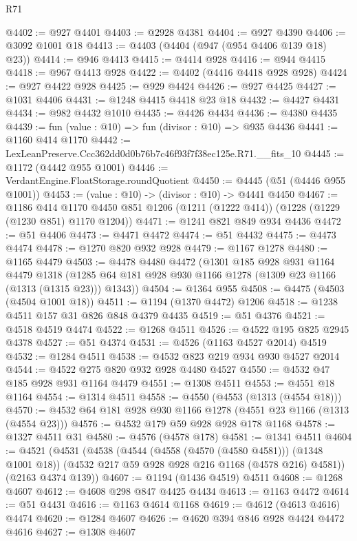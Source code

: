 \begin{lexlean}{R71}
\begin{coremodule}
@4402 := @927 @4401
@4403 := @2928 @4381
@4404 := @927 @4390
@4406 := @3092 @1001 @18
@4413 := @4403 (@4404 (@947 (@954 @4406 @139 @18) @23))
@4414 := @946 @4413
@4415 := @4414 @928
@4416 := @944 @4415
@4418 := @967 @4413 @928
@4422 := @4402 (@4416 @4418 @928 @928)
@4424 := @927 @4422 @928
@4425 := @929 @4424
@4426 := @927 @4425
@4427 := @1031 @4406
@4431 := @1248 @4415 @4418 @23 @18
@4432 := @4427 @4431
@4434 := @982 @4432 @1010
@4435 := @4426 @4434
@4436 := @4380 @4435
@4439 := fun (value : @10) => fun (divisor : @10) => @935 @4436
@4441 := @1160 @414 @1170
@4442 := LexLeanPreserve.Ccc362dd0d0b76b7c46f93f7f38ec125e.R71.__fits_10
@4445 := @1172 (@4442 @955 @1001)
@4446 := VerdantEngine.FloatStorage.roundQuotient
@4450 := @4445 (@51 (@4446 @955 @1001))
@4453 := (value : @10) -> (divisor : @10) -> @4441 @4450
@4467 := @1186
    @414
    @1170
    @4450
    @851
    @1206
    (@1211 (@1222 @414))
    (@1228 (@1229 (@1230 @851) @1170 @1204))
@4471 := @1241 @821 @849 @934 @4436
@4472 := @51 @4406
@4473 := @4471 @4472
@4474 := @51 @4432
@4475 := @4473 @4474
@4478 := @1270 @820 @932 @928
@4479 := @1167 @1278
@4480 := @1165 @4479
@4503 := @4478
    @4480
    @4472
    (@1301
      @185
      @928
      @931
      @1164
      @4479
      @1318
      (@1285 @64 @181 @928 @930 @1166 @1278 (@1309 @23 @1166 (@1313 (@1315 @23))) @1343))
@4504 := @1364 @955
@4508 := @4475 (@4503 (@4504 @1001 @18))
@4511 := @1194 (@1370 @4472) @1206
@4518 := @1238 @4511 @157 @31 @826 @848 @4379 @4435
@4519 := @51 @4376
@4521 := @4518 @4519 @4474
@4522 := @1268 @4511
@4526 := @4522 @195 @825 @2945 @4378
@4527 := @51 @4374
@4531 := @4526 (@1163 @4527 @2014) @4519
@4532 := @1284 @4511
@4538 := @4532 @823 @219 @934 @930 @4527 @2014
@4544 := @4522 @275 @820 @932 @928 @4480 @4527
@4550 := @4532 @47 @185 @928 @931 @1164 @4479
@4551 := @1308 @4511
@4553 := @4551 @18 @1164
@4554 := @1314 @4511
@4558 := @4550 (@4553 (@1313 (@4554 @18)))
@4570 := @4532 @64 @181 @928 @930 @1166 @1278 (@4551 @23 @1166 (@1313 (@4554 @23)))
@4576 := @4532 @179 @59 @928 @928 @178 @1168
@4578 := @1327 @4511 @31
@4580 := @4576 (@4578 @178)
@4581 := @1341 @4511
@4604 := @4521
    (@4531
      (@4538
        (@4544 (@4558 (@4570 (@4580 @4581))) (@1348 @1001 @18))
        (@4532 @217 @59 @928 @928 @216 @1168 (@4578 @216) @4581))
      (@2163 @4374 @139))
@4607 := @1194 (@1436 @4519) @4511
@4608 := @1268 @4607
@4612 := @4608 @298 @847 @4425 @4434
@4613 := @1163 @4472
@4614 := @51 @4431
@4616 := @1163 @4614 @1168
@4619 := @4612 (@4613 @4616) @4474
@4620 := @1284 @4607
@4626 := @4620 @394 @846 @928 @4424 @4472 @4616
@4627 := @1308 @4607

\end{coremodule}
\end{lexlean}
